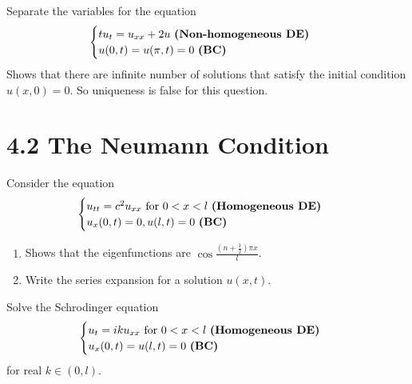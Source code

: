 \documentclass{report}
\begin{document}
\begin{question}{}{}
Separate the variables for the equation 
\begin{align*}
\begin{cases}
  tu_t=u_{xx}+2u\text{ \textbf{(Non-homogeneous DE)} }\\
  u(0,t)=u(\pi ,t)=0\text{ \textbf{(BC)} }
\end{cases}
\end{align*}
Shows that there are infinite number of solutions that satisfy the initial condition $u(x,0)=0$. So uniqueness is false for this question. 
\end{question}
\section{4.2 The Neumann Condition}
\begin{question}{}{}
Consider the equation 
\begin{align*}
\begin{cases}
  u_{tt}=c^2u_{xx}\text{ for }0<x<l\text{ \textbf{(Homogeneous DE)} }\\
  u_x(0,t)=0,u(l,t)=0\text{ \textbf{(BC)} }
\end{cases}
\end{align*}
\begin{enumerate}[label=(\alph*)]
  \item Shows that the eigenfunctions are $\cos \frac{(n+ \frac{1}{2})\pi x}{l}$. 
  \item Write the series expansion for a solution $u(x,t)$.
\end{enumerate}
\end{question}
\begin{question}{}{}
Solve the Schrodinger equation 
\begin{align*}
\begin{cases}
  u_t=iku_{xx}\text{ for }0<x<l\text{ \textbf{(Homogeneous DE)} } \\
  u_x(0,t)=u(l,t)=0\text{ \textbf{(BC)} }
\end{cases}
\end{align*}
for real $k \in (0,l)$. 
\end{question}
\end{document}
